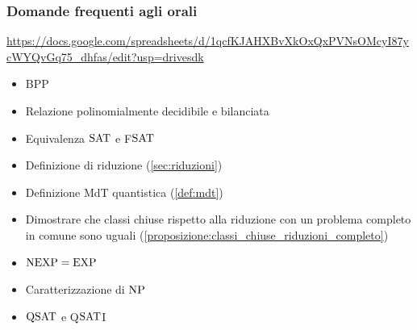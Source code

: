 \subsubsection{Domande frequenti agli orali}
\url{https://docs.google.com/spreadsheets/d/1qcfKJAHXBvXkOxQxPVNsOMcyI87ycWYQvGq75_dhfas/edit?usp=drivesdk}\\
\begin{itemize}
\item BPP
\item Relazione polinomialmente decidibile e bilanciata
\item Equivalenza $\text{SAT}$ e F$\text{SAT}$
\item Definizione di riduzione (\ref{sec:riduzioni})
\item Definizione MdT quantistica (\ref{def:mdt})
\item Dimostrare che classi chiuse rispetto alla riduzione 
con un problema completo in comune sono uguali (\ref{proposizione:classi_chiuse_riduzioni_completo})
\item $\text{NEXP} = \text{EXP}$
\item Caratterizzazione di $\text{NP}$
\item $\text{Q}\text{SAT}$ e Q$\text{SAT}$I
\end{itemize}